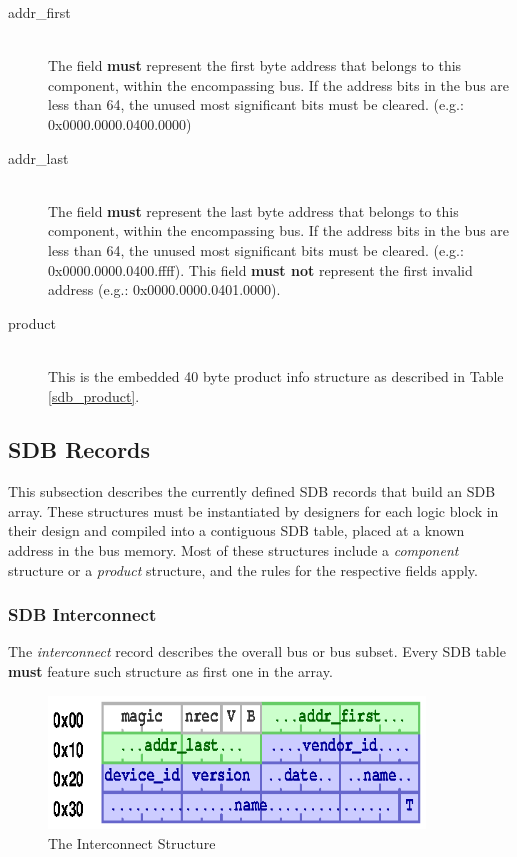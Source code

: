 \documentclass[a4paper, 12pt]{article}
\begin{document}
\begin{description}
\item[addr\_first] \hfill \\
The field \textbf{must} represent the first byte address that belongs to this component,
within the encompassing bus. If the address bits in the bus are less than 64, the
unused most significant bits must be cleared. (e.g.: 0x0000.0000.0400.0000)

\item[addr\_last] \hfill \\
The field \textbf{must} represent the last byte address that belongs to this component,
within the encompassing bus. If the address bits in the bus are less than 64, the
unused most significant bits must be cleared. (e.g.: 0x0000.0000.0400.ffff).
This field \textbf{must not} represent the first invalid address (e.g.: 0x0000.0000.0401.0000).

\item[product] \hfill \\
This is the embedded 40 byte product info structure as described in Table \ref{sdb_product}.
\end{description}

\subsection{SDB Records}

This subsection describes the currently defined SDB records that build an SDB array.
These
structures must be instantiated by designers for each logic block in their design and compiled into
a contiguous SDB table, placed at a known address in the bus memory.  Most of these structures
include a \textit{component} structure or a \textit{product} structure, and the rules for the
respective fields apply.

\subsubsection{SDB Interconnect}

The \textit{interconnect} record describes the overall bus or bus subset. Every
SDB table \textbf{must} feature such structure as first one in the array.

\begin{figure}[h]
\centering%
\includegraphics[width=100mm]{img/sdb-interconnect.ps}
\caption{The Interconnect Structure}
\label{fig:FigureInterconnect}
\end{figure}
\end{document}
